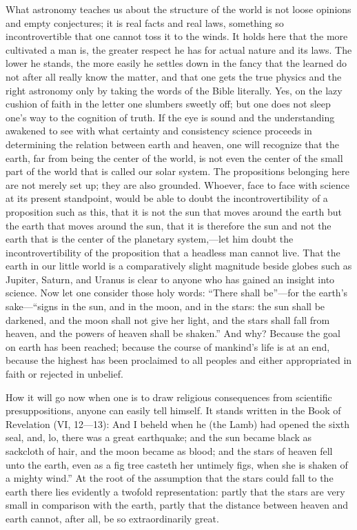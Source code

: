 \documentclass[12pt]{book}
\newcommand{\opage}[1]{\marginnote{\footnotesize\textit{[#1]}}}
\begin{document}
What astronomy teaches us about the structure of the world is not loose
opinions and empty conjectures; it is real facts and real laws,
something so incontrovertible that one cannot toss it to the winds. It
holds here that the more cultivated a man is, the greater respect he has
for actual nature and its laws. The lower he stands, the more easily he
settles down in the fancy that the learned do not after all really know
the matter, and that one gets the true physics and the right astronomy
only by taking the words of the Bible literally. Yes, on the lazy
cushion of faith in the letter one slumbers sweetly off; but one does
not sleep one's way to the cognition of truth. If the eye is sound and
the understanding awakened to see with what certainty and consistency
science proceeds in
\opage{66}\setcounter{footnote}{0}%
determining the relation between earth and heaven, one will recognize
that the earth, far from being the center of the world, is not even the
center of the small part of the world that is called our solar system.
The propositions belonging here are not merely set up; they are also
grounded. Whoever, face to face with science at its present standpoint,
would be able to doubt the incontrovertibility of a proposition such as
this, that it is not the sun that moves around the earth but the earth
that moves around the sun, that it is therefore the sun and not the
earth that is the center of the planetary system,---let him doubt the
incontrovertibility of the proposition that a headless man cannot live.
That the earth in our little world is a comparatively slight magnitude
beside globes such as Jupiter, Saturn, and Uranus is clear to anyone who
has gained an insight into science. Now let one consider those holy
words: ``There shall be''---for the earth's sake---``signs in the sun,
and in the moon, and in the stars: the sun shall be darkened, and the
moon shall not give her light, and the stars shall fall from heaven, and
the powers of heaven shall be shaken.'' And why? Because the goal on
earth has been reached; because the course of mankind's life is at an
end, because the highest has been proclaimed to all peoples and either
appropriated in faith or rejected in unbelief.

How it will go now when one is to draw religious consequences from
scientific presuppositions, anyone can easily tell himself. It stands
written in the Book of Revelation (VI, 12---13): And I beheld when he
(the Lamb)
had opened the sixth seal, and, lo, there was a great earthquake; and
the sun became black as sackcloth of hair, and the moon became as blood;
and the stars of heaven fell unto the earth, even as a fig tree casteth
her untimely figs, when she is shaken of a mighty wind.'' At the root of
the assumption that the stars could fall to the earth there lies
\opage{67}\setcounter{footnote}{0}%
evidently a twofold representation: partly that the stars are very
small in comparison with the earth, partly that the distance between
heaven and earth cannot, after all, be so extraordinarily great.
\end{document}
